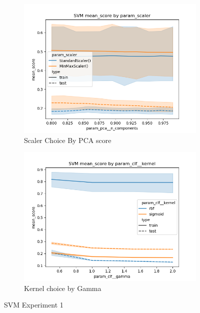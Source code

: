 \documentclass[12pt]{article}
\begin{document}
\begin{figure}
    \begin{subfigure}{.5\textwidth}
        \includegraphics[width=.95\textwidth]{../../results_Experiment1/svm/param_scaler_mean_score_param_pca__n_components.png}
        \caption{Scaler Choice By PCA score}
        \end{subfigure}%
      \begin{subfigure}{.5\textwidth}
        \includegraphics[width=.95\textwidth]{../../results_Experiment1/svm/param_clf__kernel_mean_score_param_clf__gamma.png}
        \caption{Kernel choice by Gamma}
      \end{subfigure}
      \caption{SVM Experiment 1}
      \label{figure5}
\end{figure}
\end{document}
